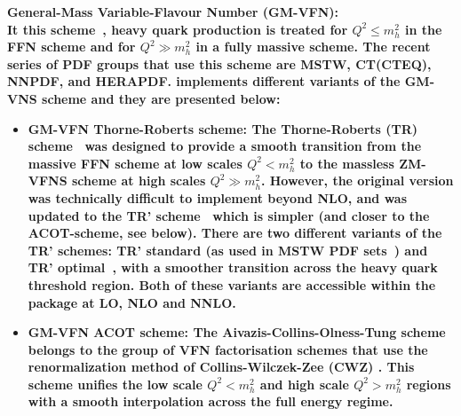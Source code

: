 \begin{description}
\item \bf{General-Mass Variable-Flavour Number (GM-VFN):}\rm
\\
It this scheme~\cite{VFN}, heavy quark production is treated for
$Q^2 \le m_h^2$ in the FFN scheme and for $Q^2 \gg m_h^2$
in a fully massive scheme. 
The recent series of PDF groups that use this scheme are MSTW, CT(CTEQ), NNPDF, and HERAPDF.
\fitter implements different variants of the GM-VNS scheme and they are presented below:
% 
\begin{itemize}
%
\item \bf {GM-VFN Thorne-Roberts scheme:} \rm
%
%
The Thorne-Roberts (TR) scheme~\cite{Thorne:1997ga} was designed to provide a smooth transition 
from the massive FFN scheme at low scales $Q^2 < m_h^2$ to the massless ZM-VFNS scheme at high scales $Q^2 \gg m_h^2$. 
However, the original version was technically difficult to implement beyond NLO, and was updated 
to the TR' scheme~\cite{Thorne:2006qt} which is simpler (and closer to the ACOT-scheme, see below).
There are two different variants of the TR' schemes: TR' standard (as used in MSTW PDF sets~\cite{Thorne:2006qt,MSTWpdf}) 
and TR' optimal~\cite{Thorne:6180}, with a smoother transition across the heavy quark threshold region. 
Both of these variants are accessible within the \fitter package at LO, NLO and NNLO.
\vspace{0.1cm}
\item \bf {GM-VFN ACOT scheme:} \rm
The Aivazis-Collins-Olness-Tung scheme belongs to the group of VFN factorisation 
schemes that use the renormalization method of Collins-Wilczek-Zee (CWZ) \cite{CWZ}.
This scheme unifies the low scale $Q^2 < m_h^2$ and high scale $Q^2 > m_h^2$ regions with a smooth interpolation across the full energy regime. 

\end{itemize}
\end{description}
